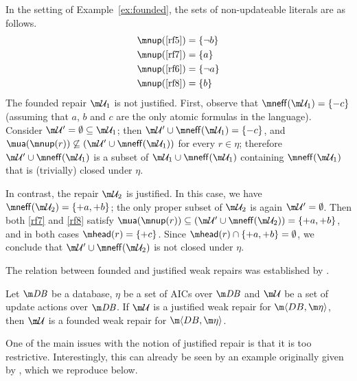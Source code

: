 \begin{example}
  In the setting of Example~\ref{ex:founded}, the sets of non-updateable literals are as follows.
  \begin{align*}
    \nup(\ref{rf5}) &= \{\neg b\} \\
    \nup(\ref{rf7}) &= \{a\} \\
    \nup(\ref{rf6}) &= \{\neg a\} \\
    \nup(\ref{rf8}) &= \{b\}
  \end{align*}
  The founded repair $\UU_1$ is not justified.
  First, observe that $\neff(\UU_1)=\{{-c}\}$ (assuming that $a$, $b$ and $c$ are the only atomic formulas in the language).
  Consider $\UU'=\emptyset\subseteq\UU_1$; then $\UU'\cup\neff(\UU_1)=\{{-c}\}$, and $\actof(\nup(r))\not\subseteq(\UU'\cup\neff(\UU_1))$ for every $r\in\eta$; therefore $\UU'\cup\neff(\UU_1)$ is a subset of $\UU_1\cup\neff(\UU_1)$ containing $\neff(\UU_1)$ that is (trivially) closed under $\eta$.

  In contrast, the repair $\UU_2$ is justified.
  In this case, we have $\neff(\UU_2)=\{{+a},{+b}\}$; the only proper subset of $\UU_2$ is again $\UU'=\emptyset$.
  Then both \ref{rf7} and \ref{rf8} satisfy $\actof(\nup(r))\subseteq(\UU'\cup\neff(\UU_2))=\{{+a},{+b}\}$, and in both cases $\head(r)=\{{+c}\}$.
  Since $\head(r)\cap\{{+a},{+b}\}=\emptyset$, we conclude that $\UU'\cup\neff(\UU_2)$ is not closed under $\eta$.
\end{example}

The relation between founded and justified weak repairs was established by \citet{tplp/CaropreseT11}.
\begin{lemma}
  \label{lem:justified-founded}
  Let $\db$ be a database, $\eta$ be a set of AICs over $\db$ and $\UU$ be a set of update actions over $\db$.
  If $\UU$ is a justified weak repair for $\fulldb$, then $\UU$ is a founded weak repair for $\fulldb$.
\end{lemma}

One of the main issues with the notion of justified repair is that it is too restrictive.
Interestingly, this can already be seen by an example originally given by \citet{tplp/CaropreseT11}, which we reproduce below.

